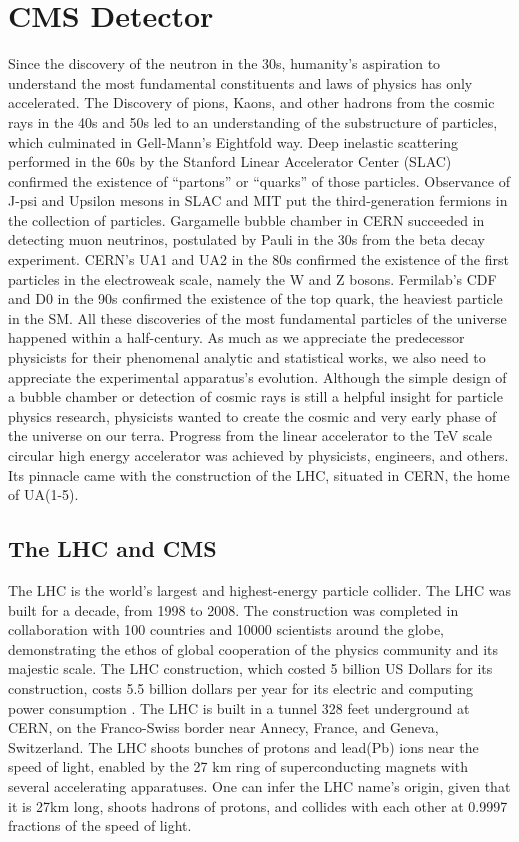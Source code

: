 \chapter{CMS Detector}\label{sec:detectors}
Since the discovery of the neutron in the 30s, humanity's aspiration to understand the most fundamental constituents and laws of physics has only accelerated.
The Discovery of pions, Kaons, and other hadrons from the cosmic rays in the 40s and 50s led to an understanding of the substructure of particles, which culminated in Gell-Mann's Eightfold way.
Deep inelastic scattering performed in the 60s by the Stanford Linear Accelerator Center (SLAC) confirmed the existence of ``partons'' or ``quarks'' of those particles.
Observance of J-psi and Upsilon mesons in SLAC and MIT put the third-generation fermions in the collection of particles.
Gargamelle bubble chamber in CERN succeeded in detecting muon neutrinos, postulated by Pauli in the 30s from the beta decay experiment.
CERN's UA1 and UA2 in the 80s confirmed the existence of the first particles in the electroweak scale, namely the W and Z bosons.
Fermilab's CDF and D0 in the 90s confirmed the existence of the top quark, the heaviest particle in the SM.
All these discoveries of the most fundamental particles of the universe happened within a half-century.
As much as we appreciate the predecessor physicists for their phenomenal analytic and statistical works, we also need to appreciate the experimental apparatus's evolution.
Although the simple design of a bubble chamber or detection of cosmic rays is still a helpful insight for particle physics research, physicists wanted to create the cosmic and very early phase of the universe on our terra.
Progress from the linear accelerator to the TeV scale circular high energy accelerator was achieved by physicists, engineers, and others.
Its pinnacle came with the construction of the LHC, situated in CERN, the home of UA(1-5).


\section{The LHC and CMS}
The LHC is the world's largest and highest-energy particle collider.
The LHC was built for a decade, from 1998 to 2008.
The construction was completed in collaboration with 100 countries and 10000 scientists around the globe, demonstrating the ethos of global cooperation of the physics community and its majestic scale.
The LHC construction, which costed 5 billion US Dollars for its construction, costs 5.5 billion dollars per year for its electric and computing power consumption \cite{LHCweb}.
The LHC is built in a tunnel 328 feet underground at CERN, on the Franco-Swiss border near Annecy, France, and  Geneva, Switzerland.
The LHC shoots bunches of protons and lead(Pb) ions near the speed of light, enabled by the 27 km ring of superconducting magnets with several accelerating apparatuses.
One can infer the LHC name's origin, given that it is 27km long, shoots hadrons of protons, and collides with each other at 0.9997 fractions of the speed of light.

